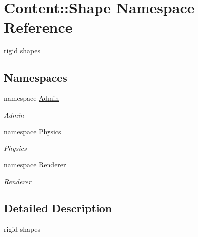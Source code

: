 \hypertarget{namespaceContent_1_1Shape}{
\section{Content::Shape Namespace Reference}
\label{namespaceContent_1_1Shape}
}


rigid shapes  
\subsection*{Namespaces}
\begin{DoxyCompactItemize}
\item 
namespace \hyperlink{namespaceContent_1_1Shape_1_1Admin}{Admin}


\begin{DoxyCompactList}\small\item\em Admin \item\end{DoxyCompactList}\item 
namespace \hyperlink{namespaceContent_1_1Shape_1_1Physics}{Physics}


\begin{DoxyCompactList}\small\item\em Physics \item\end{DoxyCompactList}\item 
namespace \hyperlink{namespaceContent_1_1Shape_1_1Renderer}{Renderer}


\begin{DoxyCompactList}\small\item\em Renderer \item\end{DoxyCompactList}\end{DoxyCompactItemize}


\subsection{Detailed Description}
rigid shapes 